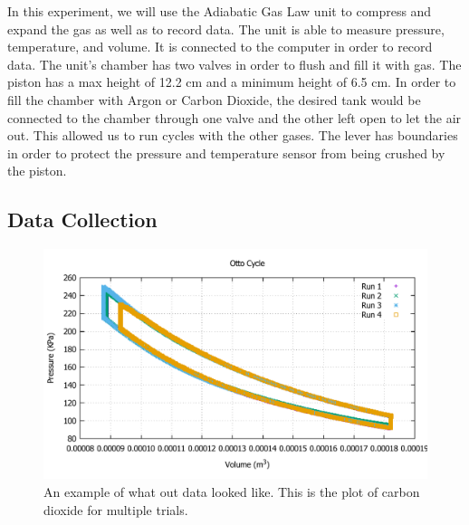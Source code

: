 \documentclass[11pt,letterpaper,onecolumn]{article}
\begin{document}
In this experiment, we will use the Adiabatic Gas Law unit to compress and expand the gas as well as to record data. The unit is able to measure pressure, temperature, and volume. It is connected to the computer in order to record data. The unit's chamber has two valves in order to flush and fill it with gas. The piston has a max height of 12.2 cm and a minimum height of 6.5 cm. In order to fill the chamber with Argon or Carbon Dioxide, the desired tank would be connected to the chamber through one valve and the other left open to let the air out. This allowed us to run cycles with the other gases. The lever has boundaries in order to protect the pressure and temperature sensor from being crushed by the piston.


\subsection{Data Collection}

\begin{figure}[H]
 \begin{center}
 \includegraphics*[scale = .6]{Otto.pdf}
 \caption{An example of what out data looked like. This is the plot of carbon dioxide for multiple trials.\label{fig:CO2} }
 \end{center}
\end{figure}
 
\end{document}
